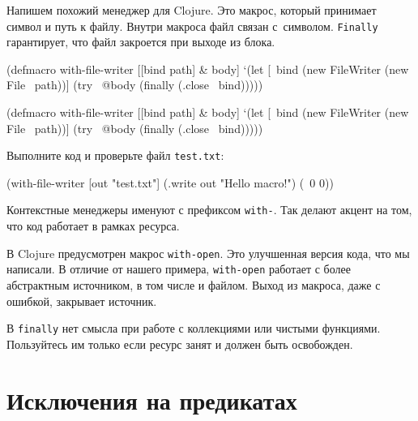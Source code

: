 Напишем похожий менеджер для Clojure. Это макрос, который принимает символ и
путь к файлу. Внутри макроса файл связан с~символом. \verb|Finally|
гарантирует, что файл закроется при выходе из блока.


\ifx\devicetype\mobile

\begin{english}
  \begin{clojure}
(defmacro with-file-writer
  [[bind path] & body]
  `(let [~bind (new FileWriter
                 (new File ~path))]
     (try
       ~@body
       (finally
         (.close ~bind)))))
  \end{clojure}
\end{english}

\else

\begin{english}
  \begin{clojure}
(defmacro with-file-writer
  [[bind path] & body]
  `(let [~bind (new FileWriter (new File ~path))]
     (try
       ~@body
       (finally
         (.close ~bind)))))
  \end{clojure}
\end{english}

\fi

Выполните код и проверьте файл \verb|test.txt|:

\begin{english}
  \begin{clojure}
(with-file-writer [out "test.txt"]
  (.write out "Hello macro!")
  (\ 0 0))
  \end{clojure}
\end{english}

Контекстные менеджеры именуют с префиксом \verb|with-|. Так делают акцент на
том, что код работает в рамках ресурса.


В Clojure предусмотрен макрос \verb|with-open|. Это улучшенная версия кода,
что мы написали. В отличие от нашего примера, \verb|with-open| работает с
более абстрактным источником, в том числе и файлом. Выход из макроса, даже с
ошибкой, закрывает источник.

В \verb|finally| нет смысла при работе с коллекциями или чистыми
функциями. Пользуйтесь им только если ресурс занят и должен быть освобожден.

\section{Исключения на предикатах}

